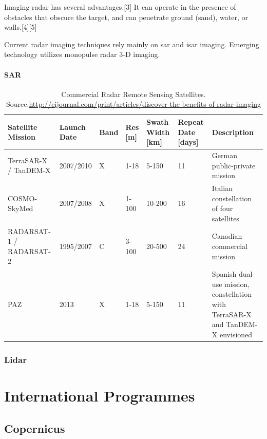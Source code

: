 \documentclass{article}
\begin{document}
Imaging radar has several advantages.[3] It can operate in the presence of obstacles that obscure the target, and can penetrate ground (sand), water, or walls.[4][5]

Current radar imaging techniques rely mainly on \ac{sar} and \ac{isar} imaging. Emerging technology utilizes monopulse radar 3-D imaging.


\paragraph{SAR}

\begin{table}[h!]
\label{fig:radar_bands}
\caption{Commercial Radar Remote Sensing Satellites. Source:\url{http://eijournal.com/print/articles/discover-the-benefits-of-radar-imaging}}
\begin{tabulary}{\textwidth}{p{2.1cm}p{1.5cm}p{1cm}p{1cm}p{1cm}LL}
\toprule
Satellite Mission & Launch Date & Band & Res [m] & Swath Width [km] & Repeat Date [days] & Description \\ 
\midrule
TerraSAR-X / TanDEM-X & 2007/2010 & X & 1-18 & 5-150 & 11 & German public-private mission \\
\midrule
COSMO-SkyMed & 2007/2008 & X & 1-100 & 10-200 & 16 & Italian constellation of four satellites \\
\midrule
RADARSAT-1 / RADARSAT-2 & 1995/2007 & C & 3-100 & 20-500 & 24 & Canadian commercial mission \\
\midrule
PAZ & 2013 & X & 1-18 & 5-150  & 11 & Spanish dual-use mission, constellation with TerraSAR-X and TanDEM-X envisioned \\ \bottomrule
\end{tabulary}
\end{table}



\subsubsection{Lidar}





\section{International Programmes}
\label{sec:intprog}

\subsection{Copernicus}
\label{ssec:copernicus}
\end{document}
